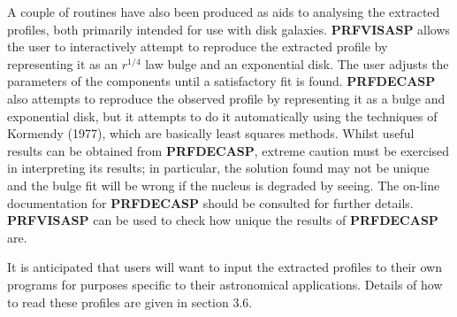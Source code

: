 A couple of routines have also been produced as aids to analysing the extracted
profiles, both primarily intended for use with disk galaxies.
{\bf PRFVISASP} allows the user to interactively attempt to reproduce the
extracted profile by representing it as an $r^{1/4}$ law bulge and an
exponential disk.
The user adjusts the parameters of the components until a satisfactory fit is
found.
{\bf PRFDECASP} also attempts to reproduce the observed profile by representing
it as a bulge and exponential disk, but it attempts to do it automatically using
the techniques of Kormendy (1977), which are basically least squares methods.
Whilst useful results can be obtained from {\bf PRFDECASP}, extreme caution must
be exercised in interpreting its results; in particular, the solution found may
not be unique and the bulge fit will be wrong if the nucleus is degraded by
seeing.
The on-line documentation for {\bf PRFDECASP} should be consulted for further
details.
{\bf PRFVISASP} can be used to check how unique the results of {\bf PRFDECASP}
are.

It is anticipated that users will want to input the extracted profiles to their
own programs for purposes specific to their astronomical applications.
Details of how to read these profiles are given in section 3.6.
